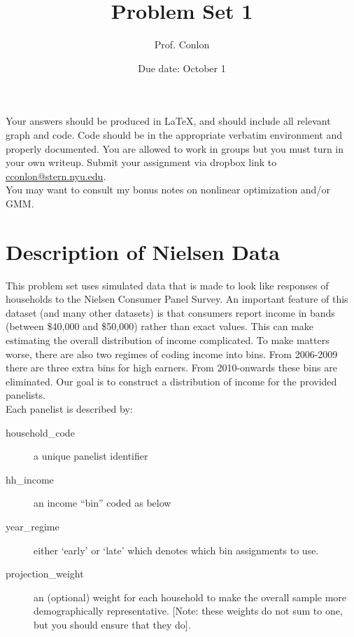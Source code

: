 \documentclass{article}
\title{Problem Set 1}
\begin{document}
\small
\date{Due date: October 1}
\author{Prof. Conlon}
\maketitle
Your answers should be produced in \LaTeX, and should include all relevant graph and code.  Code should be in the appropriate verbatim environment and properly documented. You are allowed to work in groups but you must turn in your own writeup. Submit your assignment via dropbox link to \href{mailto:cconlon@stern.nyu.edu}{cconlon@stern.nyu.edu}.\\

You may want to consult my bonus notes on nonlinear optimization and/or GMM.

\section*{\normalsize Description of Nielsen Data}
This problem set uses simulated data that is made to look like responses of households to the Nielsen Consumer Panel Survey. An important feature of this dataset (and many other datasets) is that consumers report income in bands (between \$40,000 and \$50,000) rather than exact values. This can make estimating the overall distribution of income complicated. To make matters worse, there are also two regimes of coding income into bins. From 2006-2009 there are three extra bins for high earners. From 2010-onwards these bins are eliminated. Our goal is to construct a distribution of income for the provided panelists.\\

\noindent Each panelist is described by:
\begin{description}
\item[household\_code] a unique panelist identifier
\item[hh\_income] an income ``bin'' coded as below
\item[year\_regime] either `early' or `late' which denotes which bin assignments to use.
\item[projection\_weight] an (optional) weight for each household to make the overall sample more demographically representative. [Note: these weights do not sum to one, but you should ensure that they do].
\end{description}
\end{document}
